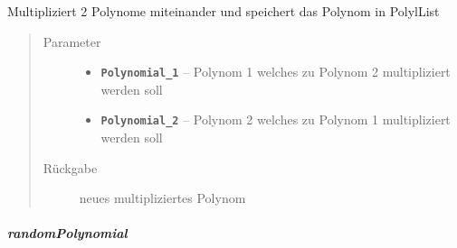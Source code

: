 \documentclass[letterpaper,10pt,ngerman]{sphinxmanual}
\begin{document}
\begin{fulllineitems}
\label{com/linuxluigi/polynomial/PolynomialList:com.linuxluigi.polynomial.PolynomialList.mathMultiply(Polynomial, Polynomial)}
Multipliziert 2 Polynome miteinander und speichert das Polynom in PolylList
\begin{quote}\begin{description}
\item[{Parameter}] \leavevmode\begin{itemize}
\item {} 
\textbf{\texttt{Polynomial\_1}} -- Polynom 1 welches zu Polynom 2 multipliziert werden soll

\item {} 
\textbf{\texttt{Polynomial\_2}} -- Polynom 2 welches zu Polynom 1 multipliziert werden soll

\end{itemize}

\item[{Rückgabe}] \leavevmode
neues multipliziertes Polynom

\end{description}\end{quote}

\end{fulllineitems}



\subparagraph{randomPolynomial}
\label{com/linuxluigi/polynomial/PolynomialList:randompolynomial}
\end{document}
